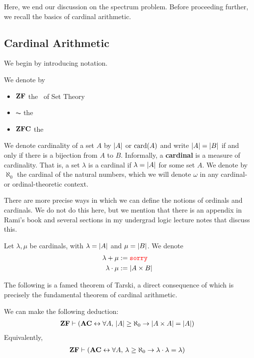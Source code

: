 Here, we end our discussion on the spectrum problem. Before proceeding further, we recall the basics of cardinal arithmetic.

\subsection{Cardinal Arithmetic}

We begin by introducing notation.

\begin{boxnotation}
    We denote by
    \begin{itemize}
        \item $\mathbf{ZF}$ the \ZFA\ of Set Theory
        \item $\AC$ the \ACA
        \item $\mathbf{ZFC}$ the \ZFCA
    \end{itemize}
\end{boxnotation}

We denote cardinality of a set $A$ by $\left\lvert A \right\rvert$ or $\operatorname{card}\!\left( A \right)$ and write $\left\lvert A \right\rvert = \left\lvert B \right\rvert$ if and only if there is a bijection from $A$ to $B$. Informally, a \textbf{cardinal} is a measure of cardinality. That is, a set $\lambda$ is a cardinal if $\lambda = \left\lvert A \right\rvert$ for some set $A$. We denote by $\aleph_{0}$ the cardinal of the natural numbers, which we will denote $\omega$ in any cardinal- or ordinal-theoretic context.

There are more precise ways in which we can define the notions of ordinals and cardinals. We do not do this here, but we mention that there is an appendix in Rami's book and several sections in my undergrad logic lecture notes that discuss this.

\begin{boxdefinition}
    Let $\lambda, \mu$ be cardinals, with $\lambda = \left\lvert A \right\rvert$ and $\mu = \left\lvert B \right\rvert$. We denote
    \begin{align*}
        \lambda + \mu &:= \textcolor{red}{\texttt{sorry}} \\
        \lambda \cdot \mu &:= \left\lvert A \times B \right\rvert
    \end{align*}
\end{boxdefinition}

The following is a famed theorem of Tarski, a direct consequence of which is precisely the fundamental theorem of cardinal arithmetic.

\begin{boxtheorem}[Tarski]
    We can make the following deduction:
    \begin{align*}
        \mathbf{ZF} \vdash \left( \mathbf{AC} \leftrightarrow \forall A, \, \left\lvert A \right\rvert \geq \aleph_{0} \to \left\lvert A \times A \right\rvert = \left\lvert A \right\rvert \right)
    \end{align*}
    Equivalently,
    \begin{align*}
        \mathbf{ZF} \vdash \left( \mathbf{AC} \leftrightarrow \forall A, \, \lambda \geq \aleph_{0} \to \lambda \cdot \lambda = \lambda \right)
    \end{align*}
\end{boxtheorem}

